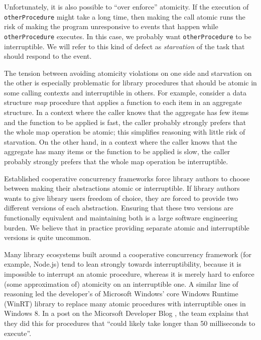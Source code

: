 \documentclass[preprint, 10pt, numbers]{sigplanconf}
\begin{document}
Unfortunately, it is also possible to ``over enforce'' atomicity.
If the execution of \texttt{otherProcedure} might take a long time\footnotemark{}, then making the call atomic runs the risk of making the program unresponsive to events that happen while \texttt{otherProcedure} executes.
In this case, we probably want \texttt{otherProcedure} to be interruptible.
We will refer to this kind of defect as \emph{starvation} of the task that should respond to the event.


The tension between avoiding atomicity violations on one side and starvation on the other is especially problematic for library procedures that should be atomic in some calling contexts and interruptible in others.
For example, consider a data structure \emph{map} procedure that applies a function to each item in an aggregate structure.
In a context where the caller knows that the aggregate has few items and the function to be applied is fast, the caller probably strongly prefers that the whole map operation be atomic; this simplifies reasoning with little risk of starvation.
On the other hand, in a context where the caller knows that the aggregate has many items or the function to be applied is slow, the caller probably strongly prefers that the whole map operation be interruptible.

Established cooperative concurrency frameworks force library authors to choose between making their abstractions atomic or interruptible.
If library authors wants to give library users freedom of choice, they are forced to provide two different versions of each abstraction.
Ensuring that these two versions are functionally equivalent and maintaining both is a large software engineering burden.
We believe that in practice providing separate atomic and interruptible versions is quite uncommon.

Many library ecosystems built around a cooperative concurrency framework (for example, Node.js) tend to lean strongly towards interruptibility, because it is impossible to interrupt an atomic procedure, whereas it is merely hard to enforce (some approximation of) atomicity on an interruptible one.
A similar line of reasoning led the developer's of Microsoft Windows' core Windows Runtime (WinRT) library to replace many atomic procedures with interruptible ones in Windows 8.
In a post on the Micorsoft Developer Blog \cite{Windows8Team2012}, the team explains that they did this for procedures that ``could likely take longer than 50 milliseconds to execute''.
\end{document}
